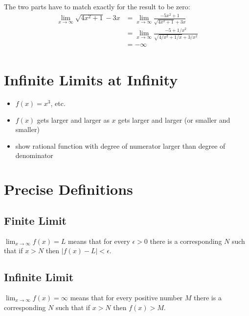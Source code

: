 \documentclass[letterpaper, landscape]{exam}
\begin{document}
  The two parts have to match exactly for the result to be zero:
  \begin{align*}
    \lim_{x \to \infty} \sqrt{4x^2 + 1} - 3x & = \lim_{x \to \infty} \frac{-5x^2 + 1}{\sqrt{4x^2 + 1} + 3x} \\
      & = \lim_{x \to \infty} \frac{-5 + 1/x^2}{\sqrt{4/x^2 + 1/x} + 3/x^2} \\
      & = \boxed{ -\infty } \\
  \end{align*}

  \section{Infinite Limits at Infinity}
  \begin{itemize}
    \item $f(x) = x^3$, etc.
    \item $f(x)$ gets larger and larger as $x$ gets larger and larger (or smaller and smaller)
    \item show rational function with degree of numerator larger than degree of denominator
  \end{itemize}

  \section{Precise Definitions}

  \subsection{Finite Limit}
  $\lim_{x \to \infty} f(x) = L$ means that for every $\epsilon > 0$ there is a corresponding
  $N$ such that if $x > N$ then $|f(x) - L| < \epsilon$.

  \subsection{Infinite Limit}
  $\lim_{x \to \infty} f(x) = \infty$ means that for every positive number $M$ there is a corresponding
  $N$ such that if $x > N$ then $f(x) > M$.
\end{document}
